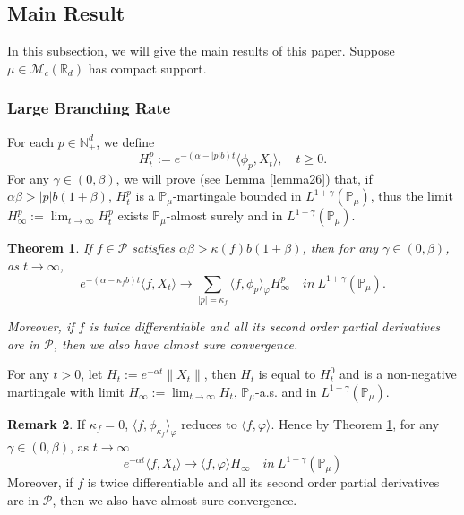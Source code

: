 \documentclass[12pt]{amsart}
\theoremstyle{plain}
\newtheorem{thm}{Theorem}[section]
\theoremstyle{definition}
\newtheorem{rem}[thm]{Remark}
\numberwithin{equation}{section}
\begin{document}
\subsection{Main Result}

In this subsection, we will give the main results of this paper. Suppose $\mu\in \mathcal M_c(\mathbb R_d)$ has compact support.
\subsubsection{Large Branching Rate}

For each $p\in \mathbb{N}_+^d$, we define
$$H_t^p:= e^{-(\alpha-|p|b)t}\langle\phi_p,X_t\rangle,\quad t\geq 0.$$
  For any $\gamma\in (0, \beta)$, we will prove (see Lemma \ref{lemma26}) that, if $\alpha\beta>|p|b(1+\beta)$, $H_t^p$ is a $\mathbb{P}_{\mu}$-martingale bounded in $L^{1+\gamma}(\mathbb{P}_{\mu})$, thus the limit $H^p_{\infty}:=\lim_{t\rightarrow \infty}H_t^p$ exists $\mathbb{P}_{\mu}$-almost surely and in $L^{1+\gamma}(\mathbb{P}_{\mu})$.
 \begin{thm}\label{Theorem11}
     If $f \in \mathcal{P}$ satisfies $\alpha\beta>\kappa(f)b(1+\beta)$, then for any $\gamma\in (0, \beta)$,
     as $t\rightarrow \infty$,
     $$e^{-(\alpha-\kappa_fb)t}\langle f, X_t\rangle \rightarrow\sum_{|p|=\kappa_f}\langle f, \phi_p\rangle_{\varphi} H_{\infty}^p \quad in~ L^{1+\gamma}(\mathbb{P}_{\mu}).$$

     Moreover, if $f$ is twice differentiable and all its second order partial derivatives are in $\mathcal{P}$, then we also have almost sure convergence. 
 \end{thm}
For any $t>0$, let $H_t:=e^{-\alpha t}\|X_t\|$, then $H_t$ is equal to $H_t^0$ and is a non-negative martingale with limit $H_{\infty}:=\lim_{t\rightarrow\infty}H_t$,  $\mathbb{P}_{\mu}$-a.s. and in $L^{1+\gamma}(\mathbb{P}_{\mu})$.
 \begin{rem}
    If $\kappa_f=0$, $\langle f, \phi_{\kappa_f}\rangle_{\varphi}$ reduces to $\langle f,\varphi\rangle$. Hence by Theorem \ref{Theorem11},  for any $\gamma\in (0, \beta)$, as $t\rightarrow \infty$
     $$e^{-\alpha t}\langle f, X_t\rangle \rightarrow \langle f, \varphi\rangle H_{\infty} \quad in~ L^{1+\gamma}(\mathbb{P}_{\mu})$$
    Moreover, if $f$ is twice differentiable and all its second order partial derivatives are in $\mathcal{P}$, then we also have almost sure convergence.
 \end{rem}
\end{document}
